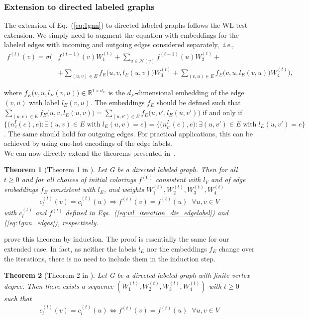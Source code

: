 \documentclass{article} \usepackage{iclr2019_conference,times}
\newtheorem{theorem}{Theorem}[section]
\newcommand{\ie}{\textit{i}.\textit{e}., }
\begin{document}
\subsubsection{Extension to directed labeled graphs}

The extension of Eq.~(\ref{eq:1gnn}) to directed labeled graphs follows the WL test extension. We simply need to augment the equation with embeddings for the labeled edges with incoming and outgoing edges considered separately,~\ie
\begin{equation}\label{eq:1gnn_edges}
\begin{split}
    f^{(t)}(v) = \sigma\Big(&f^{(t-1)}(v)W_1^{(t)} + \sum_{u \in \mathcal{N}(v)}f^{(t-1)}(u)W_2^{(t)} + \\ &+ \sum_{(u,v) \in E}f_E\big(u,v, l_E(u,v)\big)W_3^{(t)} + \sum_{(v,u) \in E}f_E\big(v,u, l_E(v,u)\big)W_4^{(t)}\Big),
\end{split}
\end{equation}

where $f_E\big(v,u,l_E(v,u)\big) \in \mathbb{R}^{1 \times d_E}$ is the $d_E$-dimensional embedding of the edge $(v,u)$ with label $l_E(v,u)$. The embeddings $f_E$ should be defined such that $\sum_{(u,v) \in E}f_E\big(u,v, l_E(u,v)\big) = \sum_{(u,v') \in E}f_E\big(u,v', l_E(u,v')\big)$ if and only if $\big\{ \big(n^I_v(e), e\big): \exists (u,v) \in E\;\mathrm{with}\;l_E(u,v) = e \big\} = \big\{ \big(n^I_{v'}(e), e\big): \exists (u,v') \in E\;\mathrm{with}\;l_E(u,v') = e \big\}$. The same should hold for outgoing edges. For practical applications, this can be achieved by using one-hot encodings of the edge labels.\\
We can now directly extend the theorems presented in~\cite{Morris2018}.
\begin{theorem}[Theorem 1 in \cite{Morris2018}]\label{thm:at_most} Let G be a directed labeled graph. Then for all $t\geq0$ and for all choices of initial colorings $f^{(0)}$ consistent with $l_V$ and of edge embeddings $f_E$ consistent with $l_E$, and weights $W_1^{(t)}, W_2^{(t)},W_3^{(t)},W_4^{(t)}$
\begin{align}\label{eq:refines}
    c_l^{(t)}(v) = c_l^{(t)}(u) \Rightarrow f^{(t)}(v) = f^{(t)}(u) \;\; \forall u,v \in V
\end{align}
with $c_l^{(t)}$ and $f^{(t)}$ defined in Eqs.~(\ref{eq:wl_iteration_dir_edgelabel}) and (\ref{eq:1gnn_edges}),  respectively. 
\end{theorem}
\cite{Morris2018} prove this theorem by induction. The proof is essentially the same for our extended case. In fact, as neither the labels $l_E$ nor the embeddings $f_E$ change over the iterations, there is no need to include them in the induction step.
\begin{theorem}[Theorem 2 in \cite{Morris2018}]\label{thm:exists} Let G be a directed labeled graph with finite vertex degree. Then there exists a sequence $(W_1^{(t)}, W_2^{(t)},W_3^{(t)},W_4^{(t)})$ with $t\geq0$ such that
\begin{align}\label{eq:equiv}
     c_l^{(t)}(v) = c_l^{(t)}(u)  \Leftrightarrow f^{(t)}(v) = f^{(t)}(u) \;\; \forall u,v \in V
\end{align}
\end{theorem}
\end{document}
